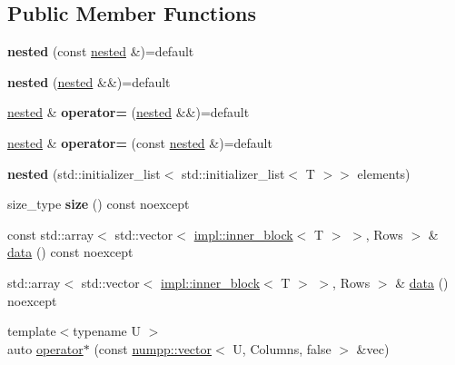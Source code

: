 \subsection*{Public Member Functions}
\begin{DoxyCompactItemize}
\item 
\mbox{\label{classnumpp_1_1matrix_1_1sparse_1_1nested_a7b64faee8e6532d8fd535fc069e75612}} 
{\bfseries nested} (const \hyperlink{classnumpp_1_1matrix_1_1sparse_1_1nested}{nested} \&)=default
\item 
\mbox{\label{classnumpp_1_1matrix_1_1sparse_1_1nested_ae2635e88208229453ffa0ca7858801f8}} 
{\bfseries nested} (\hyperlink{classnumpp_1_1matrix_1_1sparse_1_1nested}{nested} \&\&)=default
\item 
\mbox{\label{classnumpp_1_1matrix_1_1sparse_1_1nested_acb521971efcd22e628a97c398c9af9ee}} 
\hyperlink{classnumpp_1_1matrix_1_1sparse_1_1nested}{nested} \& {\bfseries operator=} (\hyperlink{classnumpp_1_1matrix_1_1sparse_1_1nested}{nested} \&\&)=default
\item 
\mbox{\label{classnumpp_1_1matrix_1_1sparse_1_1nested_aefc9f1be3eb621a4a287f313fef69f08}} 
\hyperlink{classnumpp_1_1matrix_1_1sparse_1_1nested}{nested} \& {\bfseries operator=} (const \hyperlink{classnumpp_1_1matrix_1_1sparse_1_1nested}{nested} \&)=default
\item 
\mbox{\label{classnumpp_1_1matrix_1_1sparse_1_1nested_ad5277725c13cb3677aab4f3bedbe8601}} 
{\bfseries nested} (std\+::initializer\+\_\+list$<$ std\+::initializer\+\_\+list$<$ T $>$$>$ elements)
\item 
\mbox{\label{classnumpp_1_1matrix_1_1sparse_1_1nested_ad9af43e4278ec50a869996a3b56a7ad1}} 
size\+\_\+type {\bfseries size} () const noexcept
\item 
const std\+::array$<$ std\+::vector$<$ \hyperlink{structnumpp_1_1matrix_1_1sparse_1_1impl_1_1inner__block}{impl\+::inner\+\_\+block}$<$ T $>$ $>$, Rows $>$ \& \hyperlink{classnumpp_1_1matrix_1_1sparse_1_1nested_a56a31c654f21e001e6e4cc4aa7055ee1}{data} () const noexcept
\item 
std\+::array$<$ std\+::vector$<$ \hyperlink{structnumpp_1_1matrix_1_1sparse_1_1impl_1_1inner__block}{impl\+::inner\+\_\+block}$<$ T $>$ $>$, Rows $>$ \& \hyperlink{classnumpp_1_1matrix_1_1sparse_1_1nested_a1201f9550dded2b187221ccf768a88f3}{data} () noexcept
\item 
{\footnotesize template$<$typename U $>$ }\\auto \hyperlink{classnumpp_1_1matrix_1_1sparse_1_1nested_a5348b9ed5e038a10885b5b849614fdba}{operator$\ast$} (const \hyperlink{classnumpp_1_1vector}{numpp\+::vector}$<$ U, Columns, false $>$ \&vec)
\end{DoxyCompactItemize}


